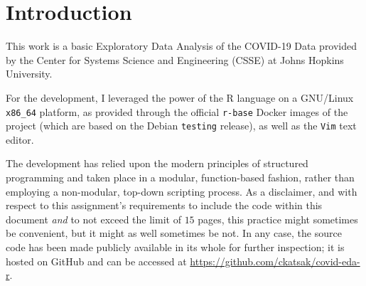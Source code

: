 \section{Introduction}

This work is a basic Exploratory Data Analysis of the COVID-19 Data provided by the Center for Systems Science and Engineering (CSSE) at Johns Hopkins University\cite{ghcsse}.

For the development, I leveraged the power of the R language on a GNU/Linux \texttt{x86\_64} platform, as provided through the official \texttt{r-base} Docker images\cite{dhrbase} of the project (which are based on the Debian \texttt{testing} release), as well as the \texttt{Vim}\cite{vim} text editor.

The development has relied upon the modern principles of structured programming and taken place in a modular, function-based fashion, rather than employing a non-modular, top-down scripting process.
As a disclaimer, and with respect to this assignment's requirements to include the code within this document \textit{and} to not exceed the limit of $15$ pages, this practice might sometimes be convenient, but it might as well sometimes be not.
In any case, the source code has been made publicly available in its whole for further inspection; it is hosted on GitHub and can be accessed at \url{https://github.com/ckatsak/covid-eda-r}.

